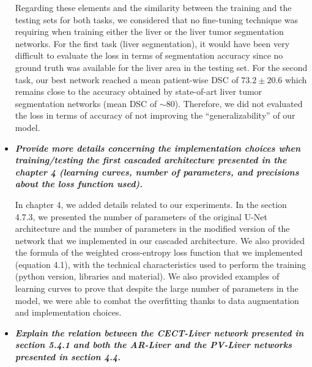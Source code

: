 \documentclass{article}
\begin{document}
\begin{itemize}
Regarding these elements and the similarity between the training and the testing sets for both tasks, we considered that no fine-tuning technique was requiring when training either the liver or the liver tumor segmentation networks. For the first task (liver segmentation), it would have been very difficult to evaluate the loss in terms of segmentation accuracy since no ground truth was available for the liver area in the testing set. For the second task, our best network reached a mean patient-wise DSC of $ 73.2 \pm 20.6 $ which remains close to the accuracy obtained by state-of-art liver tumor segmentation networks (mean DSC of $ \sim80 $). Therefore, we did not evaluated the loss in terms of accuracy of not improving the ``generalizability'' of our model.

\item \textit{\textbf{Provide more details concerning the implementation choices when training/testing the first cascaded architecture presented in the chapter 4 (learning curves, number of parameters, and precisions about the loss function used).}}

In chapter 4, we added details related to our experiments. 
In the section 4.7.3, we presented the number of parameters of the original U-Net architecture and the number of parameters in the modified version of the network that we implemented in our cascaded architecture. We also provided the formula of the weighted cross-entropy loss function that we implemented (equation 4.1), with the technical characteristics used to perform the training (python version, libraries and material).
We also provided examples of learning curves to prove that despite the large number of parameters in the model, we were able to combat the overfitting thanks to data augmentation and implementation choices.

\item \textit{\textbf{Explain the relation between the CECT-Liver network presented in section 5.4.1 and both the AR-Liver and the PV-Liver networks presented in section 4.4.}}


\end{itemize}
\end{document}
